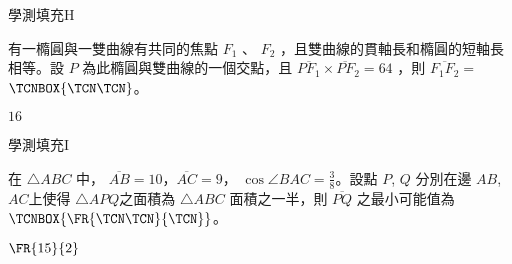 \begin{QUESTIONS}
    \begin{QUESTION}
        \begin{ExamInfo}{98}{學測}{填充}{H}
        \end{ExamInfo}
        \begin{ExamAnsRateInfo}{36}{57}{36}{15}
        \end{ExamAnsRateInfo}
        \begin{QBODY}
            有一橢圓與一雙曲線有共同的焦點 $F_1$ 、 $F_2$ ，且雙曲線的貫軸長和橢圓的短軸長相等。設 $P$ 為此橢圓與雙曲線的一個交點，且 $\overline{PF_1} \times \overline{PF}_2 =64$ ，則 $\overline{F_1F_2} =$ 
$\TCNBOX{\TCN\TCN}$。
        \end{QBODY}
        \begin{QFROMS}
        \end{QFROMS}
        \begin{QTAGS}\end{QTAGS}
        \begin{QANS}
            $16$
        \end{QANS}
        \begin{QSOLLIST}
        \end{QSOLLIST}
        \begin{QEMPTYSPACE}
        \end{QEMPTYSPACE}
    \end{QUESTION}
    \begin{QUESTION}
        \begin{ExamInfo}{98}{學測}{填充}{I}
        \end{ExamInfo}
        \begin{ExamAnsRateInfo}{11}{27}{5}{1}
        \end{ExamAnsRateInfo}
        \begin{QBODY}
            在 $\triangle ABC$ 中， $\overline{AB}=10$，$\overline{AC}=9$， $\cos \angle{BAC}= \frac{3}{8}$。設點 $P$, $Q$ 分別在邊 $AB$, $AC$上使得 $\triangle APQ$之面積為 $\triangle ABC$ 面積之一半，則 $\overline{PQ}$ 之最小可能值為 
			$\TCNBOX{\FR{\TCN\TCN}{\TCN}}$。
        \end{QBODY}
        \begin{QFROMS}
        \end{QFROMS}
        \begin{QTAGS}\end{QTAGS}
        \begin{QANS}
            $\FR{15}{2}$
        \end{QANS}
        \begin{QSOLLIST}
        \end{QSOLLIST}
        \begin{QEMPTYSPACE}
        \end{QEMPTYSPACE}
    \end{QUESTION}
\end{QUESTIONS}
